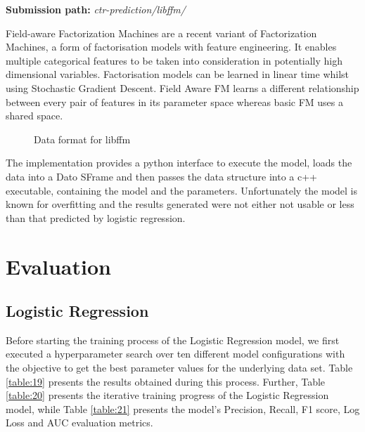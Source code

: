 \documentclass{article} %
\begin{document}
\textbf{Submission path:} \textit{ctr-prediction/libffm/}

Field-aware Factorization Machines are a recent variant of Factorization Machines, a form of  factorisation models with feature engineering. It enables multiple categorical features to be taken into consideration in potentially high dimensional variables. Factorisation models can be learned in linear time whilst using Stochastic Gradient Descent. Field Aware FM learns a different relationship between every pair of features in its parameter space whereas basic FM uses a shared space.

\begin{figure}[h]
\begin{center}
\caption{Data format for libffm}
\end{center}
\end{figure}

The implementation provides a python interface to execute the model, loads the data into a Dato SFrame and then passes the data structure into a c++ executable, containing the model and the parameters. Unfortunately the model is known for overfitting and the results generated were not either not usable or less than that predicted by logistic regression. 

\section{Evaluation}

\subsection{Logistic Regression}

Before starting the training process of the Logistic Regression model, we first executed a hyperparameter search over ten different model configurations with the objective to get the best parameter values for the underlying data set. Table \ref{table:19} presents the results obtained during this process. Further, Table \ref{table:20} presents the iterative training progress of the Logistic Regression model, while Table \ref{table:21} presents the model's Precision, Recall, F1 score, Log Loss and AUC evaluation metrics.
\end{document}
